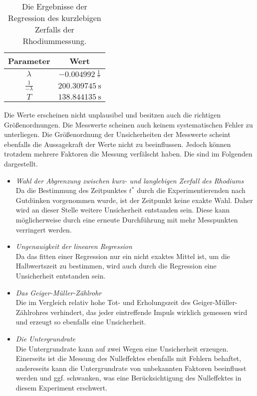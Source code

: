   \begin{table}[H]
    \centering
    \caption{Die Ergebnisse der Regression des kurzlebigen Zerfalls der Rhodiummessung.}
    \label{tab:ergebnisse3}
    \begin{tabular}
      {S S}
      \toprule
      {Parameter} & {Wert} \\
      \midrule
      $\lambda$            & $\SI{-0.004992}{\frac{1}{\second}}$ \\
      $\frac{1}{-\lambda}$ & $\SI{200.309745}{\second}$ \\
      $T$                 & $\SI{138.844135}{\second}$ \\
      \bottomrule
    \end{tabular}
  \end{table}
\noindent
Die Werte erscheinen nicht unplausibel und besitzen auch die richtigen Größenordnungen. Die Messwerte scheinen auch keinem systematischen Fehler zu unterliegen.
Die Größenordnung der Unsicherheiten der Messwerte scheint ebenfalls die Aussagekraft der Werte nicht zu beeinflussen. Jedoch können trotzdem mehrere Faktoren die Messung verfälscht haben.
Die sind im Folgenden dargestellt.
\begin{itemize}
  \item \textit{Wahl der Abgrenzung zwischen kurz- und langlebigen Zerfall des Rhodiums}\\
    Da die Bestimmung des Zeitpunktes $t^{*}$ durch die Experimentierenden nach Gutdünken vorgenommen wurde, ist der Zeitpunkt keine exakte Wahl.
    Daher wird an dieser Stelle weitere Unsicherheit entstanden sein. Diese kann möglicherweise durch eine erneute Durchführung mit mehr Messpunkten verringert werden.
  \item \textit{Ungenauigkeit der linearen Regression}\\
    Da das fitten einer Regression nur ein nicht exaktes Mittel ist, um die Halbwertszeit zu bestimmen, wird auch durch die Regression eine Unsicherheit entstanden sein.
  \item \textit{Das Geiger-Müller-Zählrohr}\\
    Die im Vergleich relativ hohe Tot- und Erholungszeit des Geiger-Müller-Zählrohres verhindert, das jeder eintreffende Impuls wirklich gemessen wird und erzeugt so ebenfalls eine
    Unsicherheit.
  \item \textit{Die Untergrundrate}\\
    Die Untergrundrate kann auf zwei Wegen eine Unsicherheit erzeugen. Einerseits ist die Messung des Nulleffektes ebenfalls mit Fehlern behaftet, andereseits kann die Untergrundrate
    von unbekannten Faktoren beeinflusst werden und ggf. schwanken, was eine Berücksichtigung des Nulleffektes in diesem Experiment erschwert.
\end{itemize}
